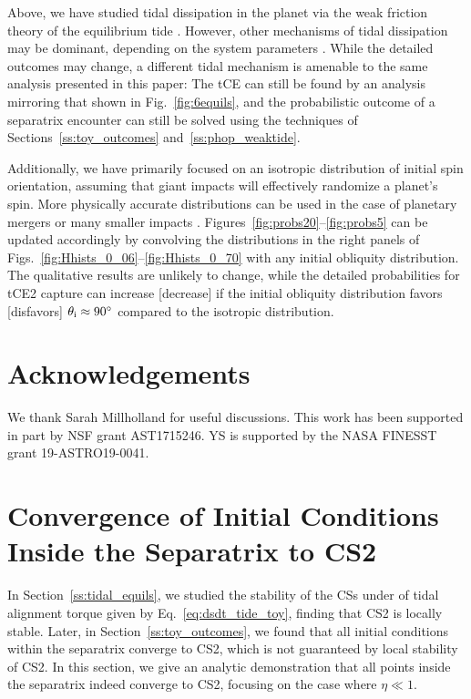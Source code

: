 \documentclass[
        fleqn,
        usenatbib,
    ]{mnras}
\begin{document}
Above, we have studied tidal dissipation in the planet via the weak friction
theory of the equilibrium tide \citep{lai2012}. However, other mechanisms of
tidal dissipation may be dominant, depending on the system parameters
\citep[e.g.][]{papaloizou_ivanov_inertial, teyssandier2019formation}. While the
detailed outcomes may change, a different tidal mechanism is amenable to the
same analysis presented in this paper: The tCE can still be found by an analysis
mirroring that shown in Fig.~\ref{fig:6equils}, and the probabilistic outcome of
a separatrix encounter can still be solved using the techniques of
Sections~\ref{ss:toy_outcomes} and~\ref{ss:phop_weaktide}.

Additionally, we have primarily focused on an isotropic distribution of initial
spin orientation, assuming that giant impacts will effectively randomize a
planet's spin. More physically accurate distributions can be used in the case of
planetary mergers \citep{li2020planetary} or many smaller impacts
\citep{dones1993does}. Figures~\ref{fig:probs20}--\ref{fig:probs5} can be
updated accordingly by convolving the distributions in the right panels of
Figs.~\ref{fig:Hhists_0_06}--\ref{fig:Hhists_0_70} with any initial obliquity
distribution. The qualitative results are unlikely to change, while the detailed
probabilities for tCE2 capture can increase [decrease] if the initial obliquity
distribution favors [disfavors] $\theta_{\rm i} \approx 90^\circ$ compared to
the isotropic distribution.

\section{Acknowledgements}

We thank Sarah Millholland for useful discussions. This work has been supported
in part by NSF grant AST1715246. YS is supported by the NASA FINESST grant
19-ASTRO19-0041.%




\appendix

\onecolumn

\section{Convergence of Initial Conditions Inside the Separatrix to CS2
}\label{app:cs_stab2}

In Section~\ref{ss:tidal_equils}, we studied the stability of the CSs under of
tidal alignment torque given by Eq.~\eqref{eq:dsdt_tide_toy}, finding that CS2
is locally stable. Later, in Section~\ref{ss:toy_outcomes}, we found that all
initial conditions within the separatrix converge to CS2, which is not
guaranteed by local stability of CS2. In this section, we give an analytic
demonstration that all points inside the separatrix indeed converge to CS2,
focusing on the case where $\eta \ll 1$.
\end{document}
